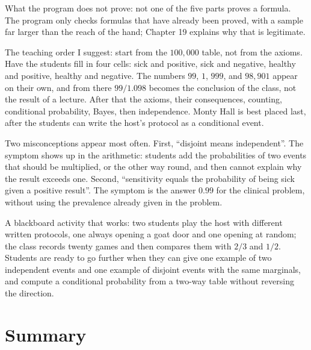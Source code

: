 What the program does not prove: not one of the five parts proves a formula.
The program only checks formulas that have already been proved, with a sample far larger
than the reach of the hand; Chapter 19 explains why that is legitimate.

\begin{untukdosen}
The teaching order I suggest: start from the $100{,}000$ table, not from
the axioms. Have the students fill in four cells: sick and positive, sick and negative,
healthy and positive, healthy and negative. The numbers $99$, $1$, $999$, and $98{,}901$
appear on their own, and from there $99/1.098$ becomes the conclusion of the class, not
the result of a lecture. After that the axioms, their consequences, counting, conditional
probability, Bayes, then independence. Monty Hall is best placed last, after the students
can write the host's protocol as a conditional event.

Two misconceptions appear most often. First, ``disjoint means independent''.
The symptom shows up in the arithmetic: students add the probabilities of two events that
should be multiplied, or the other way round, and then cannot explain why the result exceeds
one. Second, ``sensitivity equals the probability of being sick given a positive result''.
The symptom is the answer $0.99$ for the clinical problem, without using the prevalence
already given in the problem.

A blackboard activity that works: two students play the host with different written
protocols, one always opening a goat door and one opening at random; the class records
twenty games and then compares them with $2/3$ and $1/2$. Students are ready
to go further when they can give one example of two independent events and one example of
disjoint events with the same marginals, and compute a conditional probability from a
two-way table without reversing the direction.
\end{untukdosen}

\section{Summary}

